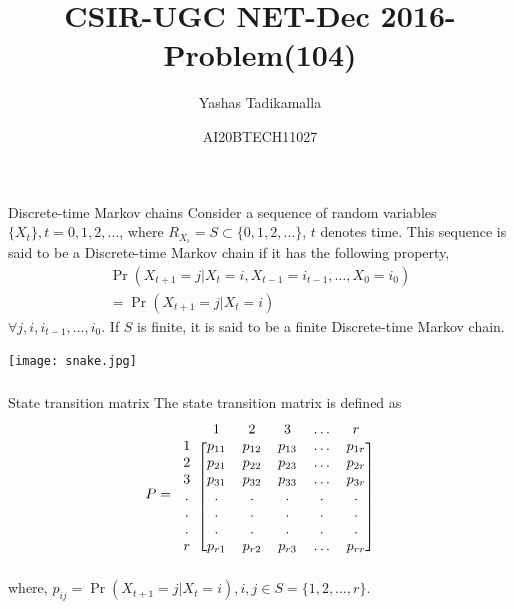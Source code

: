 \documentclass{beamer}
\title{CSIR-UGC NET-Dec 2016-Problem(104)}
\author{Yashas Tadikamalla}
\date{AI20BTECH11027}
\providecommand{\pr}[1]{\ensuremath{\Pr\left(#1\right)}}
\begin{document}
\begin{frame}
\titlepage
\end{frame}

\begin{frame}
\frametitle{}
\begin{block}{Discrete-time Markov chains}
Consider a sequence of random variables $\{X_{t}\},t=0,1,2,\dots$, where $R_{X_{i}}=S\subset\{0,1,2,\dots\}$, $t$ denotes time. This sequence is said to be a Discrete-time Markov chain if it has the following property,
\begin{multline}
    \pr{X_{t+1}=j|X_{t}=i,X_{t-1}=i_{t-1},\dots,X_{0}=i_{0}}\\=\pr{X_{t+1}=j|X_{t}=i}
\end{multline}
$\forall j,i,i_{t-1},\dots,i_{0}$. If $S$ is finite, it is said to be a finite Discrete-time Markov chain.

\centering
\texttt{[image: snake.jpg]}
\end{block}
\end{frame}

\begin{frame}
\frametitle{}
\begin{block}{State transition matrix}
The state transition matrix is defined as
\begin{align}
\label{eq:pgen}
    P=\begin{blockarray}{cccccc}
&1 & 2 & 3 & \dots & r  \\
\begin{block}{c[ccccc]}
  1 & p_{11} & p_{12} & p_{13} & \dots & p_{1r} \\
  2 & p_{21} & p_{22} & p_{23} & \dots & p_{2r} \\
  3 & p_{31} & p_{32} & p_{33} & \dots & p_{3r} \\
  . & . & . & . & . & . \\
  . & . & . & . & . & . \\
  . & . & . & . & . & . \\
  r & p_{r1} & p_{r2} & p_{r3} & \dots & p_{rr} \\
\end{block}
\end{blockarray}
\end{align}
where, $p_{ij}=\pr{X_{t+1}=j|X_{t}=i},i,j\in S=\{1,2,\dots,r\}$.
\end{block}
\end{frame}
\end{document}
